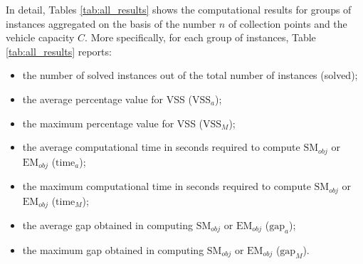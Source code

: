 \documentclass[preprint,11pt,authoryear]{elsarticle}
\begin{document}
In detail, Tables \ref{tab:all_results} shows the computational results for groups of instances aggregated on the basis of the number $n$ of collection points and the vehicle capacity $C$. 
More specifically, for each group of instances, Table \ref{tab:all_results} 
reports:
\begin{itemize}
\item the number of solved instances out of the total number of instances (solved);
\item the average percentage value for VSS ($\text{VSS}_a$);
\item the maximum percentage value for VSS ($\text{VSS}_M$);
\item the average computational time in seconds required to compute $\text{SM}_{obj}$ or $\text{EM}_{obj}$ ($\text{time}_a$);
\item the maximum computational time in seconds required to compute $\text{SM}_{obj}$ or $\text{EM}_{obj}$ ($\text{time}_M$);
\item the average gap obtained in computing $\text{SM}_{obj}$ or $\text{EM}_{obj}$ ($\text{gap}_a$);
\item the maximum gap obtained in computing $\text{SM}_{obj}$ or $\text{EM}_{obj}$ ($\text{gap}_M$).  
\end{itemize}

\end{document}
